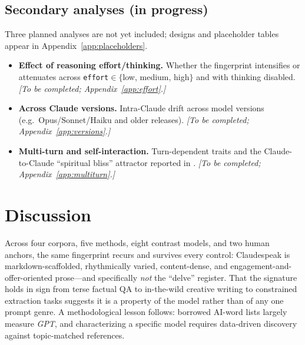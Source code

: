 \documentclass[11pt]{article}
\begin{document}
\subsection{Secondary analyses (in progress)}
\label{sec:secondary}
Three planned analyses are not yet included; designs and placeholder tables
appear in Appendix~\ref{app:placeholders}.
\begin{itemize}
  \itemsep0em
  \item \textbf{Effect of reasoning effort/thinking.} Whether the fingerprint
    intensifies or attenuates across \texttt{effort}$\in\{$low, medium, high$\}$
    and with thinking disabled. \emph{[To be completed; Appendix~\ref{app:effort}.]}
  \item \textbf{Across Claude versions.} Intra-Claude drift across model versions
    (e.g.\ Opus/Sonnet/Haiku and older releases). \emph{[To be completed;
    Appendix~\ref{app:versions}.]}
  \item \textbf{Multi-turn and self-interaction.} Turn-dependent traits and the
    Claude-to-Claude ``spiritual bliss'' attractor reported in
    \citep{anthropic2025claude4}. \emph{[To be completed;
    Appendix~\ref{app:multiturn}.]}
\end{itemize}

\section{Discussion}
Across four corpora, five methods, eight contrast models, and two human anchors,
the same fingerprint recurs and survives every control: Claudespeak is
markdown-scaffolded, rhythmically varied, content-dense, and
engagement-and-offer-oriented prose---and specifically \emph{not} the ``delve''
register. That the signature holds in sign from terse factual QA to in-the-wild
creative writing to constrained extraction tasks suggests it is a property of the
model rather than of any one prompt genre. A methodological lesson follows:
borrowed AI-word lists largely measure \emph{GPT}, and characterizing a specific
model requires data-driven discovery against topic-matched references.
\end{document}
